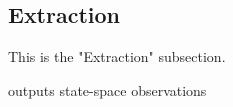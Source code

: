 \subsection{Extraction}

This is the "Extraction" subsection. 


{outputs}
{state-space}
{observations}